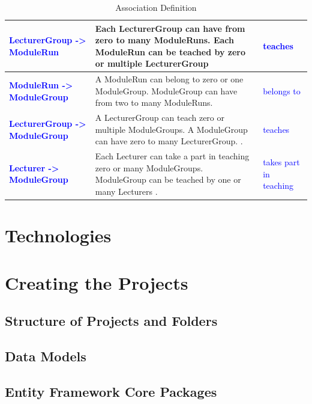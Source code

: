 \documentclass{scrartcl}
\begin{document}
\begin{table}[H]
\begin{center}
\begin{tabular}{| p{6.5cm}| p{6.5cm} |p{2.5cm}|}
  \textbf{\textcolor{blue}{  LecturerGroup -> ModuleRun}}  & 
 Each LecturerGroup can have from zero to many ModuleRuns.
 Each ModuleRun can be teached by zero or multiple LecturerGroup &  \textcolor{blue}{teaches} \\ \hline
 


\textbf{\textcolor{blue}{ModuleRun -> ModuleGroup}}  &  
A ModuleRun can belong to zero or one ModuleGroup. ModuleGroup can have from two to many ModuleRuns. &\textcolor{blue}{belongs to} \\ \hline

\textbf{\textcolor{blue}{LecturerGroup -> ModuleGroup}}  &  A LecturerGroup can teach zero or multiple ModuleGroups. A ModuleGroup can have zero to many LecturerGroup.
. &\textcolor{blue}{teaches} \\ \hline

\textbf{\textcolor{blue}{Lecturer -> ModuleGroup}}  &  Each Lecturer can take a part in teaching zero or many ModuleGroups. ModuleGroup can be teached by  one or many Lecturers .
& \textcolor{blue}{takes part in teaching} \\ \hline
\end{tabular}
\end{center}
\caption{Association Definition}
\label{table2}
\end{table}


\section{Technologies}

\section{Creating the Projects}

\subsection{Structure of Projects and Folders}

\subsection{Data Models}

\subsection{Entity Framework Core Packages}
\end{document}
